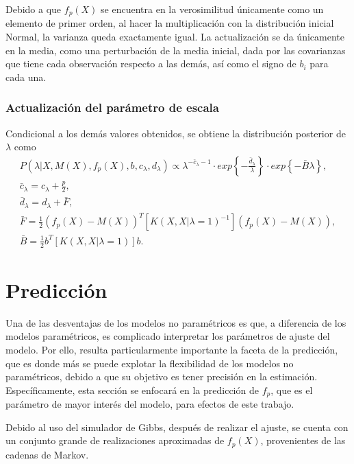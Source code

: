 Debido a que $f_p(X)$ se encuentra en la verosimilitud  \'unicamente como un elemento de primer orden, al hacer la multiplicaci\'on con la distribuci\'on inicial Normal, la varianza queda exactamente igual. La actualizaci\'on se da \'unicamente en la media, como una perturbaci\'on de la media inicial, dada por las covarianzas que tiene cada observaci\'on respecto a las dem\'as, as\'i como el signo de $b_i$ para cada una.

\subsubsection{Actualizaci\'on del par\'ametro de escala}

Condicional a los dem\'as valores obtenidos, se obtiene la distribuci\'on posterior  de $\lambda$ como
\begin{equation*}
\begin{gathered}
   P(\lambda|X,M(X),f_p(X),b,c_\lambda,d_\lambda) 
   \propto
   \lambda^{-\bar{c}_\lambda-1}
   \cdot
   exp\left\{- \frac{\bar{d}_\lambda}{\lambda}\right\}
   \cdot
   exp\left\{-\bar{B} \lambda\right\}, \\
   \bar{c}_\lambda = c_\lambda + \frac{p}{2}, \\
   \bar{d}_\lambda = d_\lambda + \bar{F}, \\
   \bar{F} = \frac{1}{2}(f_p(X)-M(X))^T [K(X,X|\lambda=1)^{-1}] (f_p(X)-M(X)), \\
   \bar{B} = \frac{1}{2}b^T [K(X,X|\lambda=1)] b.
\end{gathered}
\end{equation*}

\section{Predicci\'on}

Una de las desventajas de los modelos no param\'etricos es que, a diferencia de los modelos param\'etricos, es complicado interpretar los par\'ametros de ajuste del modelo. Por ello, resulta particularmente importante la faceta de la predicci\'on, que es donde m\'as se puede explotar la flexibilidad de los modelos no param\'etricos, debido a que su objetivo es tener precisi\'on en la estimaci\'on. Espec\'ificamente, esta secci\'on se enfocar\'a en la predicci\'on de $f_p$, que es el par\'ametro de mayor inter\'es del modelo, para efectos de este trabajo.

Debido al uso del simulador de Gibbs, despu\'es de realizar el ajuste, se cuenta con un conjunto grande de realizaciones aproximadas de $f_p(X)$, provenientes de las cadenas de Markov.

